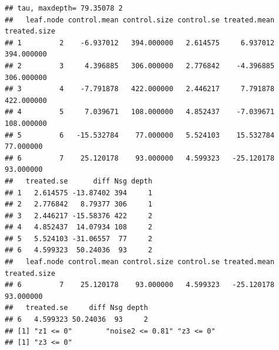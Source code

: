 \documentclass[smallextended]{svjour3}
\makeatletter
\newenvironment{kframe}{%
 \def\at@end@of@kframe{}%
 \ifinner\ifhmode%
  \def\at@end@of@kframe{\end{minipage}}%
  \begin{minipage}{\columnwidth}%
 \fi\fi%
 \def\FrameCommand##1{\hskip\@totalleftmargin \hskip-\fboxsep
 \colorbox{shadecolor}{##1}\hskip-\fboxsep
     \hskip-\linewidth \hskip-\@totalleftmargin \hskip\columnwidth}%
 \MakeFramed {\advance\hsize-\width
   \@totalleftmargin\z@ \linewidth\hsize
   \@setminipage}}%
 {\par\unskip\endMakeFramed%
 \at@end@of@kframe}
\newenvironment{knitrout}{}{} %
\makeatother
\begin{document}
\begin{knitrout}
\begin{kframe}
\begin{verbatim}
## tau, maxdepth= 79.35078 2 
##   leaf.node control.mean control.size control.se treated.mean treated.size
## 1         2    -6.937012   394.000000   2.614575     6.937012   394.000000
## 2         3     4.396885   306.000000   2.776842    -4.396885   306.000000
## 3         4    -7.791878   422.000000   2.446217     7.791878   422.000000
## 4         5     7.039671   108.000000   4.852437    -7.039671   108.000000
## 5         6   -15.532784    77.000000   5.524103    15.532784    77.000000
## 6         7    25.120178    93.000000   4.599323   -25.120178    93.000000
##   treated.se      diff Nsg depth
## 1   2.614575 -13.87402 394     1
## 2   2.776842   8.79377 306     1
## 3   2.446217 -15.58376 422     2
## 4   4.852437  14.07934 108     2
## 5   5.524103 -31.06557  77     2
## 6   4.599323  50.24036  93     2
##   leaf.node control.mean control.size control.se treated.mean treated.size
## 6         7    25.120178    93.000000   4.599323   -25.120178    93.000000
##   treated.se     diff Nsg depth
## 6   4.599323 50.24036  93     2
## [1] "z1 <= 0"        "noise2 <= 0.81" "z3 <= 0"       
## [1] "z3 <= 0"
\end{verbatim}
\end{kframe}
\end{knitrout}
\end{document}
